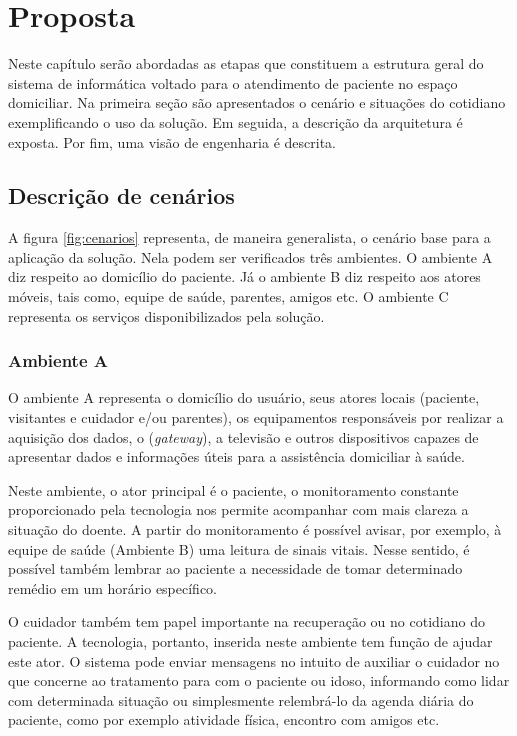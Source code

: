 \chapter{Proposta}\label{cap:proposta}

Neste capítulo serão abordadas as etapas que constituem a estrutura geral do
sistema de informática voltado para o atendimento de paciente no espaço domiciliar. 
Na primeira seção são apresentados o cenário e situações do cotidiano exemplificando
o uso da solução. Em seguida, a descrição da arquitetura é exposta. Por fim, uma
visão de engenharia é descrita.

\section{Descrição de cenários}

A figura \ref{fig:cenarios} representa, de maneira generalista, o cenário base
para a aplicação da solução. Nela podem ser verificados três ambientes. O
ambiente A diz respeito ao domicílio do paciente. Já o ambiente B diz respeito
aos atores móveis, tais como, equipe de saúde, parentes, amigos etc. O ambiente
C representa os serviços disponibilizados pela solução.


\subsection{Ambiente A} \label{subsec:ambiente-a}

O ambiente A representa o domicílio do usuário, seus atores locais (paciente,
visitantes e cuidador e/ou parentes), os equipamentos responsáveis por  realizar
a aquisição dos dados, o \stb[] (\textit{gateway}), a televisão e outros
dispositivos capazes de apresentar dados e informações úteis para a assistência
domiciliar à saúde.

Neste ambiente, o ator principal é o paciente, o monitoramento constante 
proporcionado pela tecnologia nos permite acompanhar com mais clareza a situação
do doente. A partir do monitoramento é possível avisar, por exemplo, à equipe
de saúde (Ambiente B) uma leitura de sinais vitais. Nesse sentido, é possível 
também lembrar ao paciente a necessidade de tomar determinado remédio em um
horário específico.

O cuidador também tem papel importante na recuperação ou no cotidiano do 
paciente. A tecnologia, portanto, inserida neste ambiente tem função de ajudar
este ator. O sistema pode enviar mensagens no intuito de auxiliar o cuidador no
que concerne ao tratamento para com o paciente ou idoso, informando como lidar
com determinada situação ou simplesmente relembrá-lo da agenda diária do 
paciente, como por exemplo atividade física, encontro com amigos etc.

